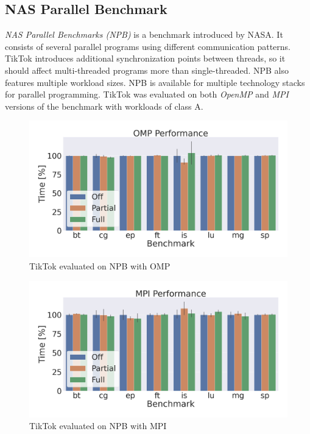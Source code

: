 \documentclass[conference]{IEEEtran}
\newcommand{\sysname}{TikTok}
\begin{document}
\subsection{NAS Parallel Benchmark}
\label{subsec:npb}

\emph{NAS Parallel Benchmarks (NPB)} is a benchmark introduced by NASA. It
consists of several parallel programs using different communication patterns.
\sysname{} introduces additional synchronization points between threads, so it
should affect multi-threaded programs more than single-threaded. NPB also
features multiple workload sizes. NPB is available for multiple technology
stacks for parallel programming. \sysname{} was evaluated on both \emph{OpenMP}
and \emph{MPI} versions of the benchmark with workloads of class A.

\begin{figure}[]
  \centering
  \includegraphics[width=\linewidth]{graphs/omp.png}
  \caption{\sysname{} evaluated on NPB with OMP}
  \label{fig:npbomp}
\end{figure}

\begin{figure}[]
  \centering
  \includegraphics[width=\linewidth]{graphs/mpi.png}
  \caption{\sysname{} evaluated on NPB with MPI}
  \label{fig:npbmpi}
\end{figure}
\end{document}
